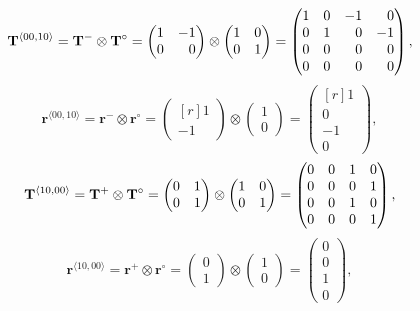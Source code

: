 \begin{equation*}
\T^{\langle 00, 10 \rangle} = \T^- \otimes \T^\circ = 
\begin{pmatrix*}[r] 1 & -1 \\ 0 & 0 \end{pmatrix*} \otimes
\begin{pmatrix} 1 & 0 \\ 0 & 1\end{pmatrix} = 
\begin{pmatrix*}[r] 1 & 0 & -1 & 0 \\ 0 & 1 & 0 & -1 \\ 0 & 0 & 0 & 0 \\ 0 & 0 & 0 & 0 \end{pmatrix*},
\end{equation*}
\begin{equation*}
\mathbf{r}^{\langle 00, 10 \rangle} = \mathbf{r}^- \otimes \mathbf{r}^\circ = \begin{pmatrix*}[r] 1 \\ -1 \end{pmatrix*} \otimes \begin{pmatrix}  1 \\ 0 \end{pmatrix} = \begin{pmatrix*}[r]  1 \\ 0 \\ -1 \\ 0 \end{pmatrix*},
\end{equation*}
\begin{equation*}
\mathbf{T}^{\langle 10, 00 \rangle} = \mathbf{T}^+ \otimes \mathbf{T}^\circ = 
\begin{pmatrix} 0 & 1 \\ 0 & 1 \end{pmatrix} \otimes
\begin{pmatrix} 1 &0 \\ 0 & 1\end{pmatrix}  =
\begin{pmatrix} 0 &0 & 1 & 0 \\ 0 & 0 & 0 & 1 \\
0 & 0 & 1 & 0\\ 0 & 0 & 0 & 1 \end{pmatrix},
\end{equation*}
\begin{equation*}
\mathbf{r}^{\langle 10, 00 \rangle} = \mathbf{r}^+ \otimes \mathbf{r}^\circ = \begin{pmatrix} 0 \\ 1 \end{pmatrix} \otimes \begin{pmatrix}  1 \\ 0 \end{pmatrix} = \begin{pmatrix}  0 \\ 0 \\ 1 \\ 0 \end{pmatrix},
\end{equation*}
